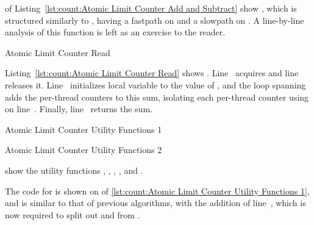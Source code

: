 \begin{fcvref}
 of
Listing~\ref{lst:count:Atomic Limit Counter Add and Subtract}
show , which is structured similarly to
, having a fastpath on
 and a slowpath on
.
A line-by-line analysis of this function is left as an exercise to
the reader.
\end{fcvref}

\begin{listing}[tbp]

\caption{Atomic Limit Counter Read}
\label{lst:count:Atomic Limit Counter Read}
\end{listing}

\begin{fcvref}
Listing~\ref{lst:count:Atomic Limit Counter Read} shows .
Line~ acquires  and
line~ releases it.
Line~ initializes local variable  to the value of
, and the loop spanning
 adds the
per-thread counters to this sum, isolating each per-thread counter
using  on line~.
Finally, line~ returns the sum.
\end{fcvref}

\begin{listing}[tbp]

\caption{Atomic Limit Counter Utility Functions 1}
\label{lst:count:Atomic Limit Counter Utility Functions 1}
\end{listing}

\begin{listing}[tb]

\caption{Atomic Limit Counter Utility Functions 2}
\label{lst:count:Atomic Limit Counter Utility Functions 2}
\end{listing}

show the utility functions
,
,
,
, and
.
\begin{fcvref}
The code for  is shown on
of \cref{lst:count:Atomic Limit Counter Utility Functions 1}, and
is similar to that of previous algorithms, with the addition of
line~, which is now required to split out  and
 from .
\end{fcvref}

